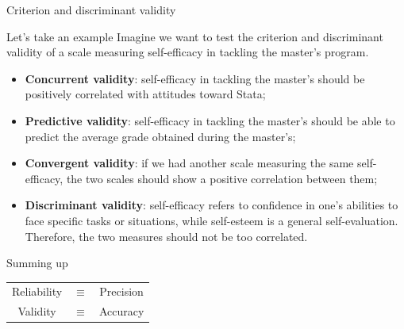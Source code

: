 \documentclass{beamer}
\begin{document}
\begin{frame}{Criterion and discriminant validity}
    \small
    \begin{block}{Let's take an example}
    Imagine we want to test the criterion and discriminant validity of a scale measuring self-efficacy in tackling the master's program.
        \begin{itemize}
            \item \textbf{Concurrent validity}: self-efficacy in tackling the master's should be positively correlated with attitudes toward Stata;
            \item \textbf{Predictive validity}: self-efficacy in tackling the master's should be able to predict the average grade obtained during the master's;
            \item \textbf{Convergent validity}: if we had another scale measuring the same self-efficacy, the two scales should show a positive correlation between them;
            \item \textbf{Discriminant validity}: self-efficacy refers to confidence in one's abilities to face specific tasks or situations, while self-esteem is a general self-evaluation. Therefore, the two measures should not be too correlated.
        \end{itemize}
    \end{block}
\end{frame}

\begin{frame}{Summing up}
\centering
\begin{tabular}{ccc}
     Reliability & $\equiv$ & Precision \\
     Validity & $\equiv$ & Accuracy
\end{tabular}
\vspace{1em}
\begin{center}
\end{center}
\end{frame}
\end{document}

